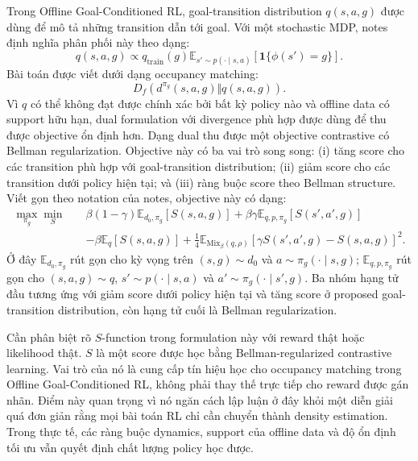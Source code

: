 Trong Offline Goal-Conditioned RL, goal-transition distribution $q(s,a,g)$ được dùng để mô tả những transition dẫn tới goal.
Với một stochastic MDP, notes định nghĩa phân phối này theo dạng:
\begin{equation}
    q(s,a,g)
    \propto
    q_{\mathrm{train}}(g)
    \mathbb{E}_{s'\sim p(\cdot\mid s,a)}
    \left[
        \mathbf{1}\{\phi(s')=g\}
    \right].
    \label{eq:tv2-goal-transition}
\end{equation}
Bài toán được viết dưới dạng occupancy matching:
\begin{equation}
    D_f
    \left(
        d^{\pi_g}(s,a,g)
        \Vert
        q(s,a,g)
    \right).
    \label{eq:tv2-offline-gcrl-matching}
\end{equation}
Vì $q$ có thể không đạt được chính xác bởi bất kỳ policy nào và offline data có support hữu hạn, dual formulation với divergence phù hợp được dùng để thu được objective ổn định hơn.
Dạng dual thu được một objective contrastive có Bellman regularization.
Objective này có ba vai trò song song: (i) tăng score cho các transition phù hợp với goal-transition distribution; (ii) giảm score cho các transition dưới policy hiện tại; và (iii) ràng buộc score theo Bellman structure.
Viết gọn theo notation của notes, objective này có dạng:
\begin{equation}
\begin{aligned}
    \max_{\pi_g}\min_S\quad
    &
    \beta(1-\gamma)\mathbb{E}_{d_0,\pi_g}
    [S(s,a,g)]
    +
    \beta\gamma
    \mathbb{E}_{q,p,\pi_g}
    [S(s',a',g)]\\
    &-
    \beta
    \mathbb{E}_{q}
    [S(s,a,g)]
    +
    \frac{1}{4}
    \mathbb{E}_{\mathrm{Mix}_\beta(q,\rho)}
    \left[
        \gamma S(s',a',g)-S(s,a,g)
    \right]^2 .
\end{aligned}
    \label{eq:tv2-offline-gcrl-score}
\end{equation}
Ở đây $\mathbb{E}_{d_0,\pi_g}$ rút gọn cho kỳ vọng trên $(s,g)\sim d_0$ và $a\sim\pi_g(\cdot\mid s,g)$; $\mathbb{E}_{q,p,\pi_g}$ rút gọn cho $(s,a,g)\sim q$, $s'\sim p(\cdot\mid s,a)$ và $a'\sim\pi_g(\cdot\mid s',g)$.
Ba nhóm hạng tử đầu tương ứng với giảm score dưới policy hiện tại và tăng score ở proposed goal-transition distribution, còn hạng tử cuối là Bellman regularization.

Cần phân biệt rõ $S$-function trong formulation này với reward thật hoặc likelihood thật.
$S$ là một score được học bằng Bellman-regularized contrastive learning.
Vai trò của nó là cung cấp tín hiệu học cho occupancy matching trong Offline Goal-Conditioned RL, không phải thay thế trực tiếp cho reward được gán nhãn.
Điểm này quan trọng vì nó ngăn cách lập luận ở đây khỏi một diễn giải quá đơn giản rằng mọi bài toán RL chỉ cần chuyển thành density estimation.
Trong thực tế, các ràng buộc dynamics, support của offline data và độ ổn định tối ưu vẫn quyết định chất lượng policy học được.

